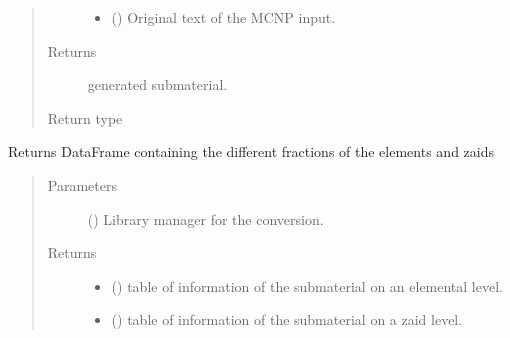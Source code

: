 \documentclass[letterpaper,10pt,english]{sphinxmanual}
\begin{document}
\begin{fulllineitems}
\begin{fulllineitems}
\begin{quote}
\begin{description}
\begin{itemize}
\item {} 
 (\sphinxstyleliteralemphasis{\sphinxupquote{{[}}}\sphinxstyleliteralemphasis{\sphinxupquote{{]}}}) \textendash{} Original text of the MCNP input.

\end{itemize}

\item[{Returns}] \leavevmode
generated submaterial.

\item[{Return type}] \leavevmode
{\hyperref[\detokenize{api/inputgeneration:matreader.SubMaterial}]{}}

\end{description}\end{quote}

\end{fulllineitems}


\begin{fulllineitems}
\label{\detokenize{api/inputgeneration:matreader.SubMaterial.get_info}}
Returns DataFrame containing the different fractions of the elements
and zaids
\begin{quote}\begin{description}
\item[{Parameters}] \leavevmode
{} ({\hyperref[\detokenize{api/initobjects:libmanager.LibManager}]{}}) \textendash{} Library manager for the conversion.

\item[{Returns}] \leavevmode
\begin{itemize}
\item {} 
 () \textendash{} table of information of the submaterial on an elemental level.

\item {} 
 () \textendash{} table of information of the submaterial on a zaid level.


\end{itemize}
\end{description}
\end{quote}
\end{fulllineitems}
\end{fulllineitems}
\end{document}
